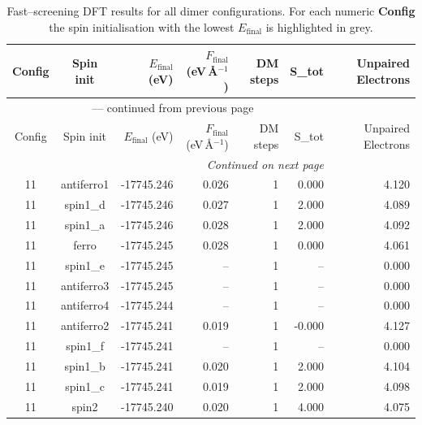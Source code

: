 
\begin{longtable}{@{}ccrrrrr@{}}
\caption{Fast–screening DFT results for all dimer configurations.
         For each numeric \textbf{Config} the spin initialisation with the
         lowest $E_{\mathrm{final}}$ is highlighted in grey.}\label{tab:dimer_full}\\
\toprule
Config & Spin init & $E_{\mathrm{final}}$ (eV) &
$F_{\mathrm{final}}$ (eV\,\AA$^{-1}$) & DM steps & S_{tot} & Unpaired Electrons\\
\midrule
\endfirsthead
\multicolumn{6}{c}{{\tablename}~\thetable{} — continued from previous page}\\
\toprule
Config & Spin init & $E_{\mathrm{final}}$ (eV) &
$F_{\mathrm{final}}$ (eV\,\AA$^{-1}$) & DM steps & S_{tot} & Unpaired Electrons\\
\midrule
\endhead
\midrule
\multicolumn{6}{r}{\emph{Continued on next page}}\\
\endfoot
\bottomrule
\endlastfoot
\rowcolor{gray!20} 11 & antiferro1 & -17745.246 & 0.026 & 1 & 0.000 & 4.120 \\
11 & spin1\_d & -17745.246 & 0.027 & 1 & 2.000 & 4.089 \\
11 & spin1\_a & -17745.246 & 0.028 & 1 & 2.000 & 4.092 \\
11 & ferro & -17745.245 & 0.028 & 1 & 0.000 & 4.061 \\
11 & spin1\_e & -17745.245 & -- & 1 & -- & 0.000 \\
11 & antiferro3 & -17745.245 & -- & 1 & -- & 0.000 \\
11 & antiferro4 & -17745.244 & -- & 1 & -- & 0.000 \\
11 & antiferro2 & -17745.241 & 0.019 & 1 & -0.000 & 4.127 \\
11 & spin1\_f & -17745.241 & -- & 1 & -- & 0.000 \\
11 & spin1\_b & -17745.241 & 0.020 & 1 & 2.000 & 4.104 \\
11 & spin1\_c & -17745.241 & 0.019 & 1 & 2.000 & 4.098 \\
11 & spin2 & -17745.240 & 0.020 & 1 & 4.000 & 4.075 \\
\end{longtable}